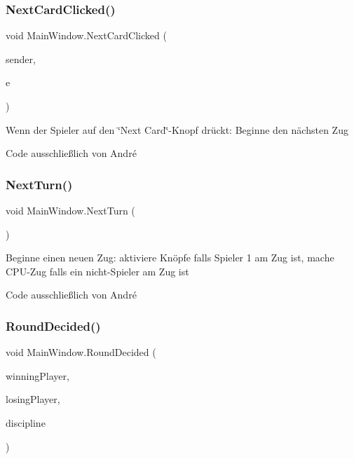\subsubsection{\texorpdfstring{Next\+Card\+Clicked()}{NextCardClicked()}}
{\footnotesize\ttfamily void Main\+Window.\+Next\+Card\+Clicked (\begin{DoxyParamCaption}\item[{object}]{sender,  }\item[{Event\+Args}]{e }\end{DoxyParamCaption})\hspace{0.3cm}{\ttfamily [protected]}}



Wenn der Spieler auf den \char`\"{}\+Next Card\char`\"{}-\/\+Knopf drückt\+: Beginne den nächsten Zug 

Code ausschließlich von André\mbox{\label{class_main_window_a66c105aa2c336bc2b05d9d574ab4eb74}} 
\subsubsection{\texorpdfstring{Next\+Turn()}{NextTurn()}}
{\footnotesize\ttfamily void Main\+Window.\+Next\+Turn (\begin{DoxyParamCaption}{ }\end{DoxyParamCaption})\hspace{0.3cm}{\ttfamily [inline]}}



Beginne einen neuen Zug\+: aktiviere Knöpfe falls Spieler 1 am Zug ist, mache C\+P\+U-\/\+Zug falls ein nicht-\/\+Spieler am Zug ist 

Code ausschließlich von André\mbox{\label{class_main_window_a94a1278f08f427a805ea3fedf760e03c}} 
\subsubsection{\texorpdfstring{Round\+Decided()}{RoundDecided()}}
{\footnotesize\ttfamily void Main\+Window.\+Round\+Decided (\begin{DoxyParamCaption}\item[{\mbox{\hyperlink{class_poke_quet_1_1_player}{Player}}}]{winning\+Player,  }\item[{\mbox{\hyperlink{class_poke_quet_1_1_player}{Player}}}]{losing\+Player,  }\item[{\mbox{\hyperlink{namespace_poke_quet_aa425f1b8cf90847021fe1177d6a7199d}{Discipline}}}]{discipline }\end{DoxyParamCaption})\hspace{0.3cm}{\ttfamily [inline]}}



